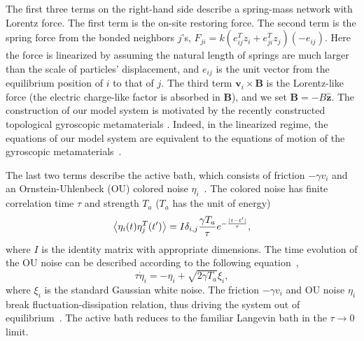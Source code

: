 \documentclass[
 preprint,
 preprintnumbers,
 amsmath,amssymb,
 aps,
 pre,
 longbibliography,
 superscriptaddress,
 10pt, twocolumn
]{revtex4-1}
\begin{document}
The first three terms on the right-hand side describe a spring-mass network with Lorentz force.
The first term is the on-site restoring force.
The second term is the spring force from the bonded neighbors $j$'s,
$F_{ji} = k (e_{ij}^T z_i + e_{ji}^T z_j) (-e_{ij})$.
Here the force is linearized by assuming the natural length of springs are much larger than the scale of particles' displacement, and $e_{ij}$ is the unit vector from the equilibrium position of $i$ to that of $j$.
The third term $\bm{v}_i\times\bm{B}$ is the Lorentz-like force (the electric charge-like factor is absorbed in $\bm{B}$), and we set $\bm{B} = -B\mathbf{\hat{z}}$.
The construction of our model system is motivated by the recently constructed topological gyroscopic metamaterials \cite{Nash2015TopologicalMechanics}. Indeed, in the linearized regime, the equations of our model system are equivalent to the equations of motion of the gyroscopic metamaterials~\cite{Lee2018TopologicalDynamics}.

The last two terms describe the active bath, which consists of friction $-\gamma v_i$ and an Ornstein-Uhlenbeck (OU) colored noise $\eta_i$~\cite{Fodor2016HowFar}.
The colored noise has finite correlation time $\tau$ and strength $T_a$ ($T_a$ has the unit of energy)
\begin{equation} \label{eqn:noise_correlation}
    \expval{\eta_i(t)\eta_{j}^T(t')} = I\delta_{i,j}\frac{\gamma T_a}{\tau} e^{-\frac{|t-t'|}{\tau}} ,
\end{equation}
where $I$ is the identity matrix with appropriate dimensions.
The time evolution of the OU noise can be described according to the following equation~\cite{Hanggi1994ColoredNoise},
\begin{equation} \label{eqn:noise_eom}
    \tau \dot{\eta}_i = -\eta_i + \sqrt{2\gamma T_a}\xi_i ,
\end{equation}
where $\xi_i$ is the standard Gaussian white noise.
The friction $-\gamma v_i$ and OU noise $\eta_i$ break fluctuation-dissipation relation, thus driving the system out of equilibrium~\cite{Fodor2016HowFar}.
The active bath reduces to the familiar Langevin bath in the $\tau \rightarrow 0$ limit.
\end{document}
